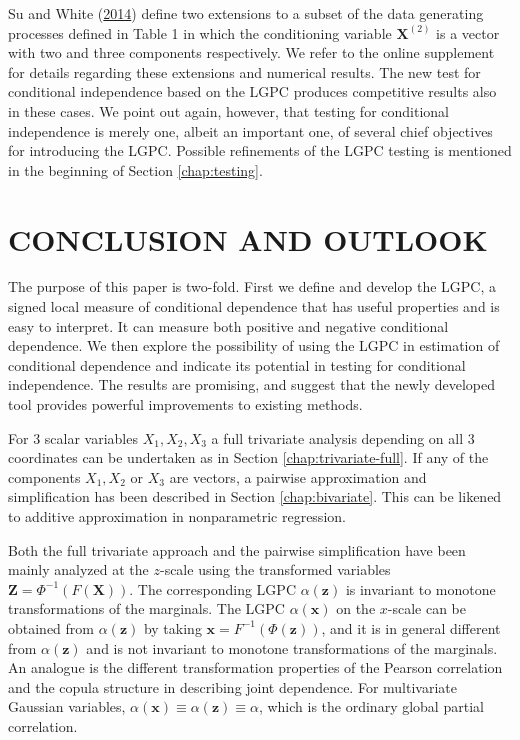 \documentclass[
  12pt,
  letterpaper]{article}
\newcommand{\X}{\bm{X}}
\newcommand{\Xtwo}{\bm{X}^{(2)}}
\newcommand{\x}{\bm{x}}
\newcommand{\Z}{\bm{Z}}
\newcommand{\z}{\bm{z}}
\theoremstyle{definition}
\theoremstyle{definition}
\theoremstyle{definition}
\theoremstyle{remark}
\begin{document}
Su and White (\protect\hyperlink{ref-su2014testing}{2014}) define two extensions to a subset of the data generating processes defined in Table 1 in which the conditioning variable \(\Xtwo\) is a vector with two and three components respectively. We refer to the online supplement for details regarding these extensions and numerical results. The new test for conditional independence based on the LGPC produces competitive results also in these cases. We point out again, however, that testing for conditional independence is merely one, albeit an important one, of several chief objectives for introducing the LGPC. Possible refinements of the LGPC testing is mentioned in the beginning of Section \ref{chap:testing}.

\hypertarget{conclusion-and-outlook}{%
\section{CONCLUSION AND OUTLOOK}\label{conclusion-and-outlook}}

The purpose of this paper is two-fold. First we define and develop the LGPC, a signed local measure of conditional dependence that has useful properties and is easy to interpret. It can measure both positive and negative conditional dependence. We then explore the possibility of using the LGPC in estimation of conditional dependence and indicate its potential in testing for conditional independence. The results are promising, and suggest that the newly developed tool provides powerful improvements to existing methods.

For 3 scalar variables \(X_1, X_2, X_3\) a full trivariate analysis depending on all 3 coordinates can be undertaken as in Section \ref{chap:trivariate-full}. If any of the components \(X_1, X_2\) or \(X_3\) are vectors, a pairwise approximation and simplification has been described in Section \ref{chap:bivariate}. This can be likened to additive approximation in nonparametric regression.

Both the full trivariate approach and the pairwise simplification have been mainly analyzed at the \(z\)-scale using the transformed variables \(\Z = \Phi^{-1}(F(\X))\). The corresponding LGPC \(\alpha(\z)\) is invariant to monotone transformations of the marginals. The LGPC \(\alpha(\x)\) on the \(x\)-scale can be obtained from \(\alpha(\z)\) by taking \(\x = F^{-1}(\Phi(\z))\), and it is in general different from \(\alpha(\z)\) and is not invariant to monotone transformations of the marginals. An analogue is the different transformation properties of the Pearson correlation and the copula structure in describing joint dependence. For multivariate Gaussian variables, \(\alpha(\x) \equiv \alpha(\z) \equiv \alpha\), which is the ordinary global partial correlation.
\end{document}
